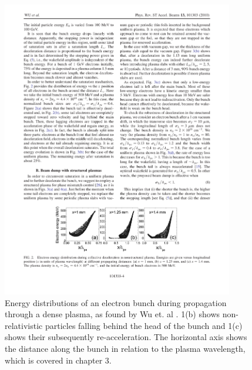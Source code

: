 \begin{figure}
\centering
\includegraphics[width=0.9\textwidth]{Wu_energy_uniform.pdf}
\caption{\small{Energy distributions of an electron bunch during propagation through a dense plasma, as found by Wu et. al \cite{Wu2010}. 1(b) shows non-relativistic particles falling behind the head of the bunch and 1(c) shows their subsequently re-acceleration. The horizontal axis shows the distance along the bunch in relation to the plasma wavelength, which is covered in chapter 3.}}
\label{Wu}
\end{figure}
